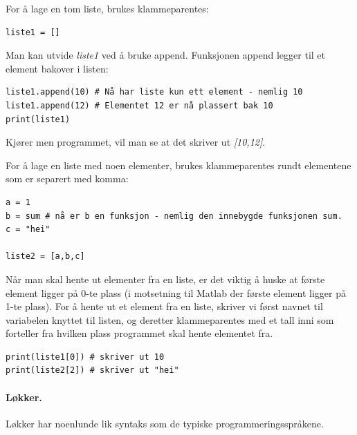 \documentclass[%
oneside,                 %
final,                   %
10pt]{article}
\begin{document}
For å lage en tom liste, brukes klammeparentes:
\begin{verbatim}
liste1 = []
\end{verbatim}

Man kan utvide \emph{liste1} ved å bruke append. Funksjonen append legger til et element bakover i listen:
\begin{verbatim}
liste1.append(10) # Nå har liste kun ett element - nemlig 10
liste1.append(12) # Elementet 12 er nå plassert bak 10
print(liste1)
\end{verbatim}
Kjører men programmet, vil man se at det skriver ut \emph{[10,12]}.



\vspace{3mm}


For å lage en liste med noen elementer, brukes klammeparentes rundt elementene som er separert med komma:

\begin{verbatim}
a = 1
b = sum # nå er b en funksjon - nemlig den innebygde funksjonen sum.
c = "hei"

liste2 = [a,b,c]
\end{verbatim}

Når man skal hente ut elementer fra en liste, er det viktig å huske at første element ligger på 0-te plass (i motsetning til Matlab der første element ligger på 1-te plass).
For å hente ut et element fra en liste, skriver vi først navnet til variabelen knyttet til listen, og deretter klammeparentes med et tall inni som forteller fra hvilken plass programmet skal hente elementet fra.
\begin{verbatim}
print(liste1[0]) # skriver ut 10
print(liste2[2]) # skriver ut "hei"
\end{verbatim}

\paragraph{Løkker.}
Løkker har noenlunde lik syntaks som de typiske programmeringsspråkene.
\end{document}
